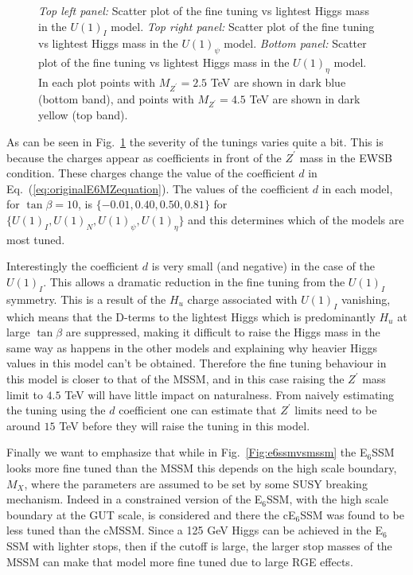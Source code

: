 \documentclass[preprint,amsmath,amssymb,aps,superscriptaddress,prd,
showpacs,floatfix,nofootinbib]{revtex4-1}
\begin{document}
\begin{figure}
\begin{center}
\caption{\textit{Top left panel:} Scatter plot of the fine tuning vs lightest
Higgs mass in the $U(1)_I$ model.  \textit{Top right panel:} Scatter plot of
the fine tuning vs lightest Higgs mass in the $U(1)_\psi$ model.
\textit{Bottom panel:} Scatter plot of the fine tuning vs lightest Higgs mass
in the $U(1)_\eta$ model.  In each plot points with $M_{Z^\prime} = 2.5$ TeV
are shown in dark blue (bottom band), and points with $M_{Z^\prime} = 4.5$
TeV are shown in dark yellow (top band).}
\label{Fig:othere6modelsvsmssm}
\end{center}
\end{figure}

As can be seen in Fig.~\ref{Fig:othere6modelsvsmssm} the severity of the
tunings varies quite a bit.  This is because the charges appear as
coefficients in front of the $Z^\prime$ mass in the EWSB condition.  These
charges change the value of the coefficient $d$ in
Eq.~(\ref{eq:originalE6MZequation}).  The values of the coefficient $d$ in
each model, for $\tan\beta = 10$, is $\{-0.01 , 0.40 , 0.50 , 0.81 \}$ for
$\{U(1)_I , U(1)_N , U(1)_\psi , U(1)_\eta \}$ and this determines which of
the models are most tuned.

Interestingly the coefficient $d$ is very small (and negative) in the
case of the $U(1)_I$.  This allows a dramatic reduction in the fine
tuning from the $U(1)_I$ symmetry.  This is a result of the $H_u$
charge associated with $U(1)_I$ vanishing, which means that the
D-terms to the lightest Higgs which is predominantly $H_u$ at large
$\tan\beta$ are suppressed, making it difficult to raise the Higgs
mass in the same way as happens in the other models and explaining why
heavier Higgs values in this model can't be obtained.  Therefore the
fine tuning behaviour in this model is closer to that of the MSSM, and
in this case raising the $Z^\prime$ mass limit to $4.5$ TeV will have
little impact on naturalness.  From naively estimating the tuning
using the $d$ coefficient one can estimate that $Z^\prime$ limits
need to be around $15$ TeV before they will raise the tuning in this
model.

Finally we want to emphasize that while in Fig.~\ref{Fig:e6ssmvsmssm}
the E$_6$SSM looks more fine tuned than the MSSM this depends on the
high scale boundary, $M_X$, where the parameters are assumed to be set
by some SUSY breaking mechanism.  Indeed in \cite{Athron:2013ipa} a
constrained version of the E$_6$SSM, with the high scale boundary at
the GUT scale, is considered and there the cE$_6$SSM was found to be
less tuned than the cMSSM.  Since a 125 GeV Higgs can be achieved in
the E$_6$SSM with lighter stops, then if the cutoff is large, the
larger stop masses of the MSSM can make that model more fine tuned due
to large RGE effects.
\end{document}
